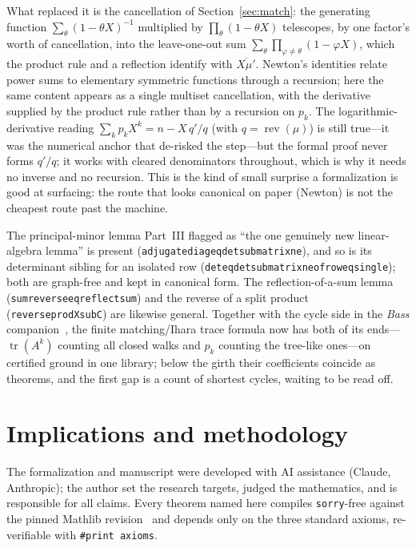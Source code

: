\documentclass[11pt]{article}
\newcommand{\lean}[1]{{\def\_{\textunderscore\allowbreak}\texttt{#1}}}
\DeclareMathOperator{\tr}{tr}
\DeclareMathOperator{\rev}{rev}
\begin{document}
What replaced it is the cancellation of Section~\ref{sec:match}: the generating function
$\sum_\theta(1-\theta X)^{-1}$ multiplied by $\prod_\theta(1-\theta X)$ telescopes, by one factor's
worth of cancellation, into the leave-one-out sum $\sum_\theta\prod_{\varphi\neq\theta}(1-\varphi X)$,
which the product rule and a reflection identify with $\overline{X\mu'}$. Newton's identities relate
power sums to elementary symmetric functions through a recursion; here the same content appears as a
single multiset cancellation, with the derivative supplied by the product rule rather than by a
recursion on $p_k$. The logarithmic-derivative reading $\sum_kp_kX^k=n-X\,q'/q$ (with $q=\rev(\mu)$)
is still true---it was the numerical anchor that de-risked the step---but the formal proof never forms
$q'/q$; it works with cleared denominators throughout, which is why it needs no inverse and no
recursion. This is the kind of small surprise a formalization is good at surfacing: the route that
looks canonical on paper (Newton) is not the cheapest route past the machine.

The principal-minor lemma Part~III flagged as ``the one genuinely new linear-algebra lemma'' is
present (\lean{adjugate\_diag\_eq\_det\_submatrix\_ne}), and so is its determinant sibling for an
isolated row (\lean{det\_eq\_det\_submatrix\_ne\_of\_row\_eq\_single}); both are graph-free and kept in
canonical form. The reflection-of-a-sum lemma (\lean{sum\_reverse\_eq\_reflect\_sum}) and the reverse
of a split product (\lean{reverse\_prod\_X\_sub\_C}) are likewise general. Together with the cycle side
in the \emph{Bass} companion~\cite{Bass}, the finite matching/Ihara trace formula now has both of its
ends---$\tr(A^k)$ counting all closed walks and $p_k$ counting the tree-like ones---on certified
ground in one library; below the girth their coefficients coincide as theorems, and the first gap is a
count of shortest cycles, waiting to be read off.

\section{Implications and methodology}
\label{sec:methodology}

The formalization and manuscript were developed with AI assistance (Claude, Anthropic); the author set
the research targets, judged the mathematics, and is responsible for all claims. Every theorem named
here compiles \lean{sorry}-free against the pinned Mathlib revision~\cite{Mathlib} and depends only on
the three standard axioms, re-verifiable with \lean{\#print axioms}.
\end{document}
